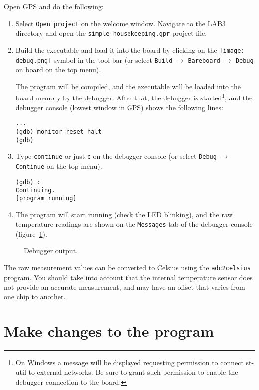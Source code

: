 Open GPS and do the following:
\begin{enumerate}
\item Select {\tt Open project} on the welcome window. Navigate to the LAB3 directory and open the {\tt simple\_housekeeping.gpr} project file.
\item Build the executable and load it into the board by clicking on the \hbox{\texttt{[image: debug.png]}} symbol in the tool bar (or select {\tt Build} $\rightarrow$ {\tt Bareboard} $\rightarrow$ {\tt Debug} on board on the top menu).

The program will be compiled, and the executable will be loaded into the board memory by the debugger. After that, the debugger is started\footnote{On Windows a message will be displayed requesting permission to connect st-util to external networks. Be sure to grant such permission to enable the debugger connection to the board.}, and the debugger console (lowest window in GPS) shows the following lines:
\begin{verbatim}
...
(gdb) monitor reset halt
(gdb)
\end{verbatim}

\item Type {\tt continue} or just {\tt c} on the debugger console (or select {\tt Debug} $\rightarrow$ {\tt Continue} on the top menu).
\begin{verbatim}
(gdb) c
Continuing.
[program running]
\end{verbatim}

\item The program will start running (check the LED blinking), and the raw temperature readings are shown on the {\tt Messages} tab of the debugger console (figure~\ref{fig:gdb-output}).
\end{enumerate}

\begin{figure}[h]
            \caption{Debugger output.}
            \label{fig:gdb-output}
\end{figure}

The raw measurement values can be converted to Celsius using the {\tt adc2celsius} program. You should take into account that the internal temperature sensor does not provide an accurate measurement, and may have an offset that varies from one chip to another.

\section{Make changes to the program}


